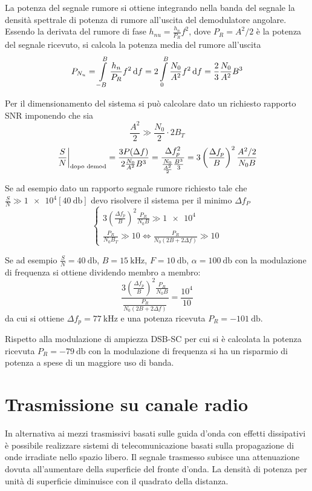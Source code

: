 La potenza del segnale rumore si ottiene integrando nella banda del segnale la densità spettrale di potenza di rumore all'uscita del demodulatore angolare.
Essendo la derivata del rumore di fase $h_{nu}=\frac{h_n}{P_R}f^2$, dove $P_R=A^2/2$ è la potenza del segnale ricevuto, si calcola la potenza media del rumore all'uscita
\begin{equation}
P_{N_u}=\int\limits_{-B}^{B}{\frac{h_n}{P_R}f^2}{\,\mathop{}\!\mathrm{d}{f}}=2\int\limits_{0}^{B}{\frac{N_0}{A^2}f^2}{\,\mathop{}\!\mathrm{d}{f}}=\frac{2}{3}\frac{N_0}{A^2}B^3
\end{equation}

Per il dimensionamento del sistema si può calcolare dato un richiesto rapporto \ac{SNR} imponendo che sia
\begin{equation}
\frac{A^2}{2}\gg\frac{N_0}{2}\cdot 2B_T
\end{equation}
\begin{equation}
\left.{\frac{S}{N}}\right\rvert_{\text{dopo demod}}=\frac{3 P(\Delta f)}{2\frac{N_0}{A^2}B^3}=\frac{\Delta f_p^2}{\frac{N_0}{\frac{A^2}{2}}\frac{B^3}{3}}=3\left(\frac{\Delta f_p}{B}\right)^2\frac{A^2/2}{N_0 B}
\end{equation}

\begin{esempio}
Se ad esempio dato un rapporto segnale rumore richiesto tale che $\frac{S}{N}\gg\num{1e4} [\SI{40}{\decibel}]$ devo risolvere il sistema per il minimo $\Delta f_P$
\[\begin{cases}
3\left(\frac{\Delta f_p}{B}\right)^2\frac{P_R}{N_0 B}\gg\num{1e4}\\\frac{P_R}{N_0 B_T}\gg 10 \iff \frac{P_R}{N_0(2B+2\Delta f)}\gg 10
\end{cases}\]

Se ad esempio $\frac{S}{N}=\SI{40}{\decibel}$, $B=\SI{15}{\kilo\hertz}$, $F=\SI{10}{\decibel}$, $\alpha=\SI{100}{\decibel}$ con la modulazione di frequenza si ottiene dividendo membro a membro:
\[\frac{3\left(\frac{\Delta f_p}{B}\right)^2\frac{P_R}{N_0 B}}{\frac{P_R}{N_0(2B+2\Delta f)}}=\frac{10^4}{10}\]
da cui si ottiene $\Delta f_p=\SI{77}{\kilo\hertz}$ e una potenza ricevuta $P_R=\SI{-101}{\decibel}$.

Rispetto alla modulazione di ampiezza \ac{DSB-SC} per cui si è calcolata la potenza ricevuta $P_R=\SI{-79}{\decibel}$ con la modulazione di frequenza si ha un risparmio di potenza a spese di un maggiore uso di banda.
\end{esempio}
\clearpage
\section{Trasmissione su canale radio}\label{cap:canale_radio_attenuazione_spazio_libero}
In alternativa ai mezzi trasmissivi basati sulle guida d'onda con effetti dissipativi è possibile realizzare sistemi di telecomunicazione basati sulla propagazione di onde irradiate nello spazio libero. Il segnale trasmesso subisce una attenuazione dovuta all'aumentare della superficie del fronte d'onda. La densità di potenza per unità di superficie diminuisce con il quadrato della distanza.

